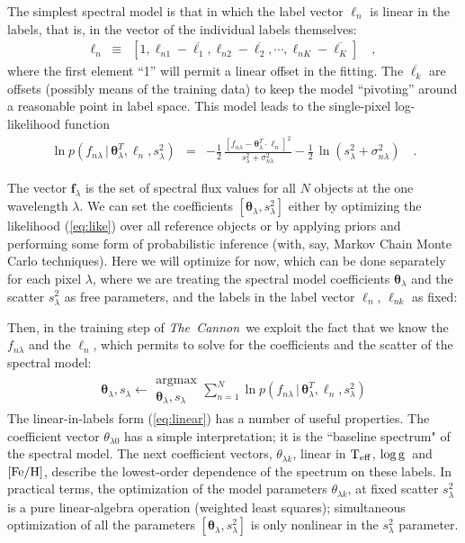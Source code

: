 \documentclass[12pt, preprint]{aastex}
\newcommand{\tc}{\textsl{The~Cannon}}
\newcommand{\set}[1]{\bm{#1}}
\newcommand{\starlabel}{\ell}
\newcommand{\starlabelvec}{\set{\starlabel}}
\newcommand{\mean}[1]{\overline{#1}}
\newcommand{\given}{\,|\,}
\newcommand{\teff}{\mbox{$\rm T_{eff}$}}
\newcommand{\feh}{\mbox{$\rm [Fe/H]$}}
\newcommand{\logg}{\mbox{$\rm \log g$}}
\begin{document}
The simplest spectral model is that in which the label vector $\starlabelvec_n$ is
linear in the labels, that is, in the vector of the individual labels themselves:
\begin{eqnarray}
\starlabelvec_n &\equiv& [1,
                           \starlabel_{n1} - \mean{\starlabel_1},
                           \starlabel_{n2} - \mean{\starlabel_2},
                           \cdots,
                           \starlabel_{nK} - \mean{\starlabel_K}]
\label{eq:linear}\quad,
\end{eqnarray}
where the first element ``1'' will permit a linear offset in the fitting.
The $\mean{\starlabel_k}$ are offsets (possibly means of the training data) to
keep the model ``pivoting'' around a reasonable point in label space.
This model leads to the single-pixel log-likelihood function 
\begin{eqnarray}
\ln p(f_{n\lambda}\given\set{\theta}^T_\lambda, \starlabelvec_n, s_\lambda^2) &=&
 -\frac{1}{2}\,\frac{[f_{n\lambda} - \set{\theta}^T_\lambda \cdot \starlabelvec_n]^2}{s_\lambda^2 + \sigma_{n\lambda}^2}
 -\frac{1}{2}\,\ln(s_\lambda^2 + \sigma_{n\lambda}^2)
\label{eq:like}\quad.
\end{eqnarray}

The vector $\set{f}_\lambda$ is the set of spectral flux values for
all $N$ objects at the one wavelength $\lambda$.
We can set the coefficients $[\set{\theta}_\lambda,s_\lambda^2]$ either by
optimizing the likelihood (\ref{eq:like}) over all reference objects or by applying priors and
performing some form of probabilistic inference (with, say, Markov
Chain Monte Carlo techniques).
Here we will optimize for now, which can be done separately for each pixel $\lambda$, where
we are treating the spectral model coefficients $\set{\theta}_\lambda$ and the scatter $s_\lambda^2$ as free parameters, and the
labels in the label vector $\starlabelvec_n$, $\starlabel_{nk}$ as fixed:

Then, in the training step of \tc\ we exploit the fact that we know the $f_{n\lambda}$
and the $\starlabelvec_n$, which permits to solve for the coefficients and the scatter of the spectral model:
\begin{eqnarray}
\set{\theta}_\lambda,s_\lambda \leftarrow \substack{\mbox{argmax}\\{\set{\theta}_\lambda}, s_\lambda}
\sum_{n=1}^N \ln p(f_{n\lambda}\given\set{\theta}^T_\lambda, \starlabelvec_n, s_\lambda^2)
\label{eq:trainingstep}
\end{eqnarray}
The linear-in-labels form (\ref{eq:linear}) has a number of useful properties.
The coefficient vector $\theta_{\lambda 0}$ has a simple interpretation;
it is the ``baseline spectrum" of the spectral model. 
The next coefficient vectors,  $\theta_{\lambda k}$, linear in \teff , \logg ~and \feh,
describe the lowest-order dependence of the spectrum on these labels.
In practical terms, the optimization of the model parameters $\theta_{\lambda k}$, at fixed scatter
$s_\lambda^2$ is a pure linear-algebra operation (weighted least
squares); simultaneous optimization of all the parameters
$[\set{\theta}_\lambda,s_\lambda^2]$ is only nonlinear in the $s_\lambda^2$
parameter.
\end{document}
